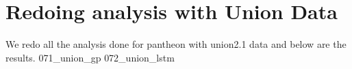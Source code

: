 \section{Redoing analysis with Union Data}
\label{results_gp_union}
We redo all the analysis done for pantheon with union2.1 data and below are the results.
{071_union_gp}
{072_union_lstm}